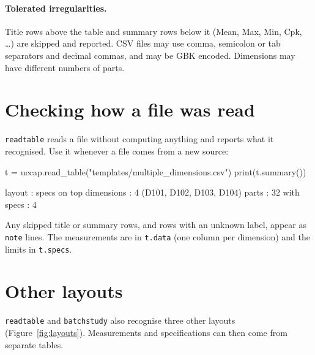 \documentclass[a4paper,11pt,oneside,openany,parskip=half-,headings=standardclasses,toc=flat,numbers=noenddot]{scrbook}
\newcommand{\code}[1]{\texttt{\begingroup\def\_{\textunderscore\allowbreak}#1\endgroup}}
\newcommand{\figref}[1]{Figure~\ref{#1}}
\begin{document}
\paragraph{Tolerated irregularities.} Title rows above the table and summary rows below it (Mean, Max,
Min, Cpk, \ldots) are skipped and reported. CSV files may use comma, semicolon or tab separators and
decimal commas, and may be GBK encoded. Dimensions may have different numbers of parts.

\section{Checking how a file was read}

\code{read\_table} reads a file without computing anything and reports what it recognised. Use it
whenever a file comes from a new source:

\begin{pycode}
t = uccap.read_table("templates/multiple_dimensions.csv")
print(t.summary())
\end{pycode}

\begin{outbox}[t.summary()]
layout     : specs on top
dimensions : 4  (D101, D102, D103, D104)
parts      : 32
with specs : 4
\end{outbox}

Any skipped title or summary rows, and rows with an unknown label, appear as \code{note} lines. The
measurements are in \code{t.data} (one column per dimension) and the limits in \code{t.specs}.

\section{Other layouts}\label{sec:layouts}

\code{read\_table} and \code{batch\_study} also recognise three other layouts
(\figref{fig:layouts}). Measurements and specifications can then come from separate tables.
\end{document}
